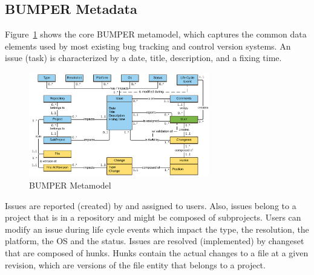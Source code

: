 \documentclass[conference]{IEEEtran}
\begin{document}
\subsection{BUMPER Metadata}
\label{sub:BUMPER Metadata}

Figure~\ref{fig:bumper-metamodel}  shows the core BUMPER metamodel, which captures the common data elements used by most existing bug tracking and control version systems.
An issue (task) is characterized by a date, title, description, and a fixing time.

\begin{figure}
  \centering
  \includegraphics[width=0.7\textwidth]{media/Bumper-Model.png}
  \caption{BUMPER Metamodel\label{fig:bumper-metamodel}}
\end{figure}

Issues are reported (created) by and assigned to users.
Also, issues belong to a project that is in a repository and might be composed of subprojects.
Users can modify an issue during life cycle events which impact the type, the resolution, the platform, the OS and the status.
Issues are resolved (implemented) by changeset that are composed of hunks.
Hunks contain the actual changes to a file at a given revision, which are versions of the file entity that belongs to a project.
\end{document}
